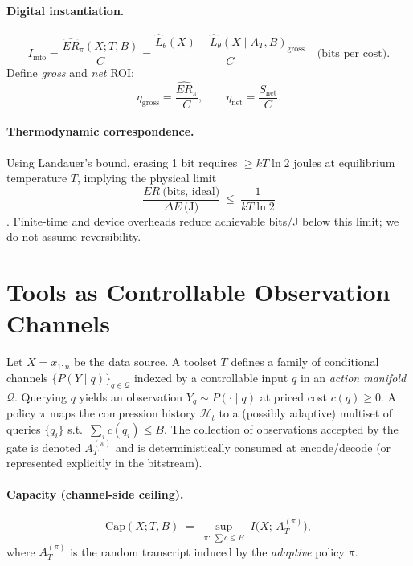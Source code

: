 \documentclass[12pt,a4paper]{article}
\newcommand{\Iinfo}{I_{\mathrm{info}}}
\begin{document}
\paragraph{Digital instantiation.}
\begin{equation}
\Iinfo=\frac{\widehat{ER}_\pi(X;T,B)}{C}
=\frac{\widehat{L}_\theta(X)-\widehat{L}_\theta(X\mid A_T,B)_{\mathrm{gross}}}{C}\quad\text{(bits per cost)}.
\end{equation}
Define \emph{gross} and \emph{net} ROI:
\[
\eta_{\text{gross}}=\frac{\widehat{ER}_\pi}{C},\qquad
\eta_{\text{net}}=\frac{S_{\text{net}}}{C}.
\]
\paragraph{Thermodynamic correspondence.}
Using Landauer's bound, erasing 1 bit requires $\ge kT\ln 2$ joules at equilibrium temperature $T$, implying the physical limit
\begin{equation}
\frac{ER\ \text{(bits, ideal)}}{\Delta E\ \text{(J)}}\ \le\ \frac{1}{kT\ln 2}
\end{equation}
\citep{landauer1961,bennett2003landauer}.
Finite-time and device overheads reduce achievable bits/J below this limit; we do not assume reversibility.

\section{Tools as Controllable Observation Channels}
\label{sec:channels}
Let $X=x_{1:n}$ be the data source. A toolset $T$ defines a family of conditional channels $\{P(Y\mid q)\}_{q\in\mathcal{Q}}$ indexed by a controllable input $q$ in an \emph{action manifold} $\mathcal{Q}$. Querying $q$ yields an observation $Y_q\sim P(\cdot\mid q)$ at priced cost $c(q)\ge 0$. A policy $\pi$ maps the compression history $\mathcal{H}_t$ to a (possibly adaptive) multiset of queries $\{q_i\}$ s.t.\ $\sum_i c(q_i)\le B$. The collection of observations accepted by the gate is denoted $A_T^{(\pi)}$ and is deterministically consumed at encode/decode (or represented explicitly in the bitstream).

\paragraph{Capacity (channel-side ceiling).}
\begin{equation}
\mathrm{Cap}(X;T,B)\;=\;\sup_{\pi:\,\sum c\le B}\; I\!\big(X;\,A_T^{(\pi)}\big),
\end{equation}
where $A_T^{(\pi)}$ is the random transcript induced by the \emph{adaptive} policy $\pi$.
\end{document}
